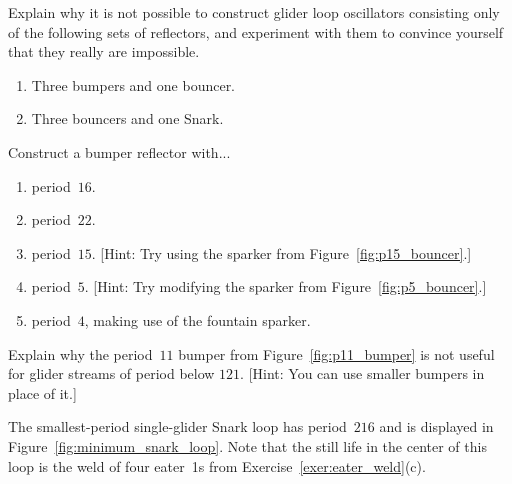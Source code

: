 \begin{multicols}{2}
	
	\mfilbreak
	
	
	\begin{problem}\label{exer:bumper_bouncer_wrong_color}
		Explain why it is not possible to construct glider loop oscillators consisting only of the following sets of reflectors, and experiment with them to convince yourself that they really are impossible.\smallskip
		
		\begin{enumerate}[label=\bf\color{ocre}(\alph*)]
			\item Three bumpers and one bouncer.
			
			\item Three bouncers and one Snark.
		\end{enumerate}
	\end{problem}
	
	
	\mfilbreak
	
	
	\begin{problem}\label{exer:bumper_high_period}
		Construct a bumper reflector with...\smallskip
		
		\begin{enumerate}[label=\bf\color{ocre}(\alph*)]
			\item period~$16$.
			
			\item period~$22$.
			
			\item period~$15$. [Hint: Try using the sparker from Figure~\ref{fig:p15_bouncer}.]
			
			\item period~$5$. [Hint: Try modifying the sparker from Figure~\ref{fig:p5_bouncer}.]
			
			\item period~$4$, making use of the fountain sparker. %
		\end{enumerate}
	\end{problem}
	
	
	\mfilbreak
	
	
	\begin{problem}\label{exer:p11_bumper_not_useful}
		Explain why the period~$11$ bumper from Figure~\ref{fig:p11_bumper} is not useful for glider streams of period below $121$. [Hint: You can use smaller bumpers in place of it.]
	\end{problem}
	
	
	\mfilbreak
	
	
	\begin{problem}\label{exer:minimum_period_snark_loop}
		The smallest-period single-glider Snark loop has period~$216$ and is displayed in Figure~\ref{fig:minimum_snark_loop}. Note that the still life in the center of this loop is the weld of four eater~1s from Exercise~\ref{exer:eater_weld}(c).\smallskip
		

\end{problem}
\end{multicols}
